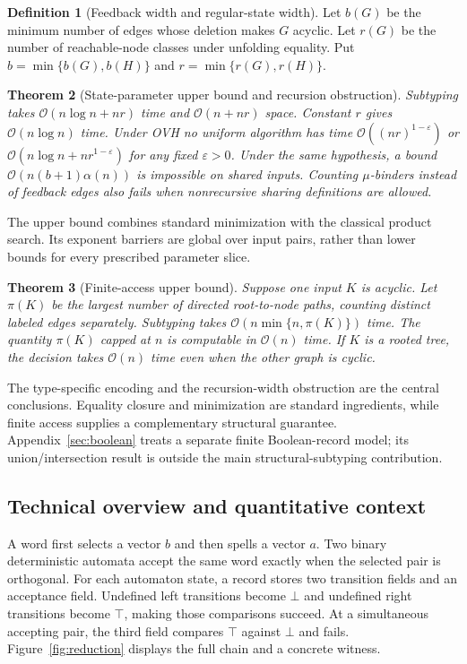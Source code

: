 \documentclass[11pt,letterpaper]{article}
\newtheorem{theorem}{Theorem}
\theoremstyle{definition}\newtheorem{definition}[theorem]{Definition}
\newcommand{\Oh}{\mathcal O}
\begin{document}
\begin{definition}[Feedback width and regular-state width]\label{def:width}
Let $b(G)$ be the minimum number of edges whose deletion makes $G$ acyclic. Let $r(G)$ be the number of reachable-node classes under unfolding equality. Put $b=\min\{b(G),b(H)\}$ and $r=\min\{r(G),r(H)\}$.
\end{definition}

\begin{theorem}[State-parameter upper bound and recursion obstruction]\label{thm:B}
Subtyping takes $\Oh(n\log n+nr)$ time and $\Oh(n+nr)$ space. Constant $r$ gives $\Oh(n\log n)$ time. Under OVH no uniform algorithm has time $\Oh((nr)^{1-\varepsilon})$ or $\Oh(n\log n+n r^{1-\varepsilon})$ for any fixed $\varepsilon>0$.
Under the same hypothesis, a bound $\Oh(n(b+1)\alpha(n))$ is impossible on shared inputs. Counting $\mu$-binders instead of feedback edges also fails when nonrecursive sharing definitions are allowed.
\end{theorem}
The upper bound combines standard minimization with the classical product search. Its exponent barriers are global over input pairs, rather than lower bounds for every prescribed parameter slice.

\begin{theorem}[Finite-access upper bound]\label{thm:access}
Suppose one input $K$ is acyclic. Let $\pi(K)$ be the largest number of directed root-to-node paths, counting distinct labeled edges separately. Subtyping takes $\Oh(n\min\{n,\pi(K)\})$ time. The quantity $\pi(K)$ capped at $n$ is computable in $\Oh(n)$ time. If $K$ is a rooted tree, the decision takes $\Oh(n)$ time even when the other graph is cyclic.
\end{theorem}

The type-specific encoding and the recursion-width obstruction are the central conclusions. Equality closure and minimization are standard ingredients, while finite access supplies a complementary structural guarantee. Appendix~\ref{sec:boolean} treats a separate finite Boolean-record model; its union/intersection result is outside the main structural-subtyping contribution.

\subsection{Technical overview and quantitative context}
A word first selects a vector $b$ and then spells a vector $a$. Two binary deterministic automata accept the same word exactly when the selected pair is orthogonal. For each automaton state, a record stores two transition fields and an acceptance field. Undefined left transitions become $\bot$ and undefined right transitions become $\top$, making those comparisons succeed. At a simultaneous accepting pair, the third field compares $\top$ against $\bot$ and fails. Figure~\ref{fig:reduction} displays the full chain and a concrete witness.
\end{document}
